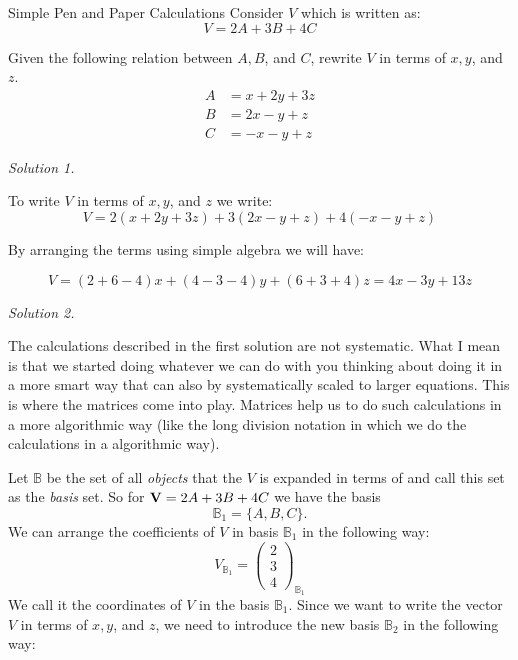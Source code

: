 \begin{example}{Simple Pen and Paper Calculations}
	Consider $V$ which is written as:
	\[ V = 2A + 3B + 4C \]
	
	Given the following relation between $A,B$, and $C$, rewrite $V$ in terms of $x,y$, and $z$.
	\begin{align*}
		A &= x + 2 y + 3 z \\
		B &= 2 x - y + z \\
		C &= -x -y + z
	\end{align*}
	
	\emph{Solution 1.}
	
	To write $V$ in terms of $x,y$, and $z$ we write:
	\begin{equation}
		V = 2 (x + 2 y + 3 z) + 3 (2 x - y + z) + 4 (-x -y + z)
		\label{example:SimplePenPaper:expandedForm}
	\end{equation}
	
	By arranging the terms using simple algebra we will have:
	
	\begin{equation}
		V = (2+6-4)x + (4-3-4)y + (6+3+4)z  = 4x -3y + 13z
		\label{example:SimplePenPaper:expanded2}
	\end{equation}


	\emph{Solution 2.}
	
	The calculations described in the first solution are not systematic. What I mean is that we started doing whatever we can do with you thinking about doing it in a more smart way that can also by systematically scaled to larger equations. This is where the matrices come into play. Matrices help us to do such calculations in a more algorithmic way (like the long division notation in which we do the calculations in a algorithmic way). \newline
	
	Let $\mathbb{B}$ be the set of all \emph{objects} that the $V$ is expanded in terms of and call this set as the \emph{basis} set. So for $\mathbf{V}= 2A + 3B + 4C$ we have the basis
	\[ \mathbb{B}_1 = \{ A,B,C \}. \]
	We can arrange the coefficients of $V$ in basis $\mathbb{B}_1$ in the following way:
	\begin{equation*}
		V_{\mathbb{B}_1}=
		\begin{pmatrix}
			2 \\
			3 \\
			4
		\end{pmatrix}_{\mathbb{B}_1}
	\end{equation*}
	We call it the coordinates of $V$ in the basis $\mathbb{B}_1$. Since we want to write the vector $V$ in terms of $x,y$, and $z$, we need to introduce the new basis $\mathbb{B}_2$ in the following way:
	

\end{example}
